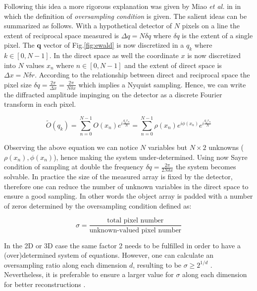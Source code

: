 Following this idea a more rigorous explanation was given by Miao \textit{et al.} in \cite{Miao1998} in which the 
definition of \textit{oversampling condition} is given. The salient ideas can be summarized as follows. 
With a hypothetical detector of $N$ pixels on a line the extent of reciprocal space measured is $\Delta q = N\delta q$ 
where $\delta q$ is the extent of a single pixel. The $\mathbf{q}$ vector of Fig.\ref{fig:ewald} is now discretized in 
a $q_k$ where $k \in [0,N-1]$. In the direct space as well the coordinate $x$ is now discretized into $N$ values 
$x_n$ where $n \in [0,N-1]$ and the extent of direct space is $\Delta x = N\delta r$. According to the relationship 
between direct and reciprocal space the pixel size $\delta q = \frac{2\pi}{\Delta x} = \frac{2\pi}{N \delta x}$ which 
implies a Nyquist sampling.
Hence, we can write the diffracted amplitude impinging on the detector as a discrete Fourier transform in each pixel. 

\begin{equation}
    \widetilde{O}(q_k) = \sum_{n = 0}^{N-1}O(x_n)e^{ i \frac{q_{k} r_{n}}{N}} = \sum_{n = 0}^{N-1}\rho(x_n)e^{ i \phi(x_n)}e^{ i \frac{q_{k} r_{n}}{N}} 
\end{equation}

Observing the above equation we can notice $N$ variables but $N\times 2$ unknowns ($\rho(x_n), \phi(x_n)$), hence 
making the system under-determined. Using now Sayre condition of sampling at double the frequency $\delta q = \frac{2\pi}{2 N \delta x}$ 
the system becomes solvable. 
In practice the size of the measured array is fixed by the detector, therefore one can reduce the number of unknown 
variables in the direct space to ensure a good sampling. In other words the object array is padded with a number of zeros 
determined by the oversampling condition defined as: 

\begin{equation}
    \sigma = \frac{\text{total pixel number}}{\text{unknown-valued pixel number}}
\end{equation}

In the 2D or 3D case the same factor 2 needs to be fulfilled in order to have a (over)determined system of equations. However,
one can calculate an oversampling ratio along each dimension $d$, resulting to be $\sigma \ge 2^{1/d}$ \cite{Latychevskaia:18}. 
Nevertheless, it is preferable to ensure a larger value for $\sigma$ along each dimension for better reconstructions \cite{Veen_2004, Ozturk_2017}. \\


